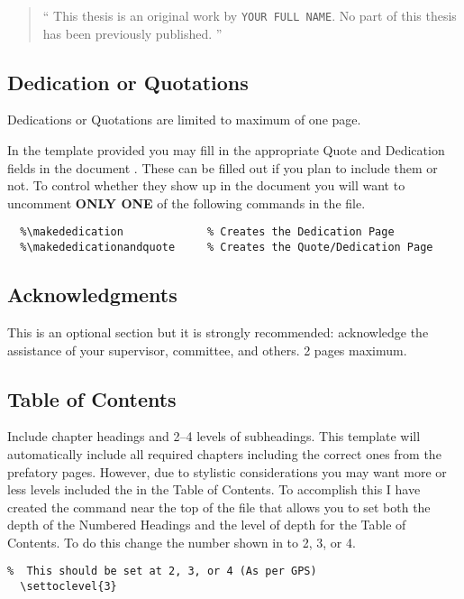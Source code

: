 				\begin{quote}
					\enquote{
						This thesis is an original work by \texttt{YOUR FULL NAME}. 
						No part of this thesis has been previously published. 
					}
				\end{quote}

		\subsection{Dedication or Quotations}
			Dedications or Quotations are limited to maximum of one page.
			
			In the template provided you may fill in the appropriate Quote and Dedication fields in the document .
			These can be filled out if you plan to include them or not.
			To control whether they show up in the document you will want to uncomment \textbf{ONLY ONE} of the following commands in the  file.

			\begin{lstlisting}[float=ht,caption=Quote and Dedication Inclusion Options (uncomment only one),label=lst:QuotesAndDedication,style=LaTeXStyle,basicstyle=\scriptsize\ttfamily,]
  %\makequote                  % Creates the Quote Page
  %\makededication             % Creates the Dedication Page
  %\makededicationandquote     % Creates the Quote/Dedication Page
			\end{lstlisting}

		\subsection{Acknowledgments}
			This is an optional section but it is strongly recommended: acknowledge the assistance of your supervisor, committee, and others. 2 pages maximum. 

		\subsection{Table of Contents}
			Include chapter headings and 2--4 levels of subheadings. 
			This template will automatically include all required chapters including the correct ones from the prefatory pages.
			However, due to stylistic considerations you may want more or less levels included the in the Table of Contents.
			To accomplish this I have created the command near the top of the  file that allows you to set both the depth of the Numbered Headings and the level of depth for the Table of Contents.
			To do this change the number shown in  to 2, 3, or 4.
			\begin{lstlisting}[float=ht,caption=Set Numbered Heading and ToC Level,label=lst:tocLevels,style=LaTeXStyle,basicstyle=\scriptsize\ttfamily,]
% Option to change the Level of subheading included in the Table of Contents
%  This should be set at 2, 3, or 4 (As per GPS)
  \settoclevel{3}
			\end{lstlisting}

